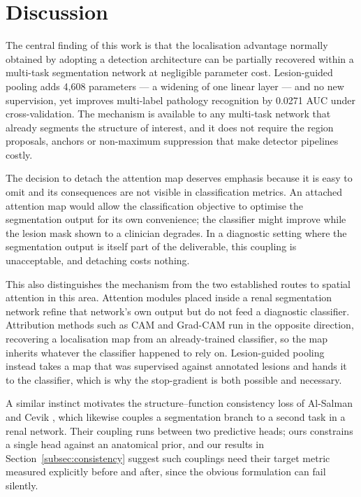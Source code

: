 \documentclass[pdflatex,sn-mathphys-num]{sn-jnl}
\theoremstyle{thmstyleone}%
\theoremstyle{thmstyletwo}%
\theoremstyle{thmstylethree}%
\begin{document}
\section{Discussion}\label{sec:discussion}

The central finding of this work is that the localisation advantage normally obtained by
adopting a detection architecture can be partially recovered within a multi-task segmentation
network at negligible parameter cost. Lesion-guided pooling adds 4,608 parameters --- a widening
of one linear layer --- and no new supervision, yet improves multi-label pathology recognition by
0.0271 AUC under cross-validation. The mechanism is available to any multi-task network that
already segments the structure of interest, and it does not require the region proposals,
anchors or non-maximum suppression that make detector pipelines costly.

The decision to detach the attention map deserves emphasis because it is easy to omit and its
consequences are not visible in classification metrics. An attached attention map would allow
the classification objective to optimise the segmentation output for its own convenience; the
classifier might improve while the lesion mask shown to a clinician degrades. In a diagnostic
setting where the segmentation output is itself part of the deliverable, this coupling is
unacceptable, and detaching costs nothing.

This also distinguishes the mechanism from the two established routes to spatial attention in
this area. Attention modules placed inside a renal segmentation network \cite{bib_renalattn}
refine that network's own output but do not feed a diagnostic classifier. Attribution methods
such as CAM and Grad-CAM \cite{bib_cam,bib_gradcam} run in the opposite direction, recovering a
localisation map from an already-trained classifier, so the map inherits whatever the classifier
happened to rely on. Lesion-guided pooling instead takes a map that was supervised against
annotated lesions and hands it to the classifier, which is why the stop-gradient is both possible
and necessary.

A similar instinct motivates the structure--function consistency loss of Al-Salman and Cevik
\cite{bib_fgckdunet}, which likewise couples a segmentation branch to a second task in a renal
network. Their coupling runs between two predictive heads; ours constrains a single head against
an anatomical prior, and our results in Section~\ref{subsec:consistency} suggest such couplings
need their target metric measured explicitly before and after, since the obvious formulation can
fail silently.
\end{document}
